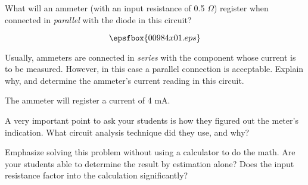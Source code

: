 

What will an ammeter (with an input resistance of 0.5 $\Omega$) register when connected in {\it parallel} with the diode in this circuit?

$$\epsfbox{00984x01.eps}$$

Usually, ammeters are connected in {\it series} with the component whose current is to be measured.  However, in this case a parallel connection is acceptable.  Explain why, and determine the ammeter's current reading in this circuit.







The ammeter will register a current of 4 mA.







A very important point to ask your students is how they figured out the meter's indication.  What circuit analysis technique did they use, and why?

Emphasize solving this problem without using a calculator to do the math.  Are your students able to determine the result by estimation alone?  Does the input resistance factor into the calculation significantly?




